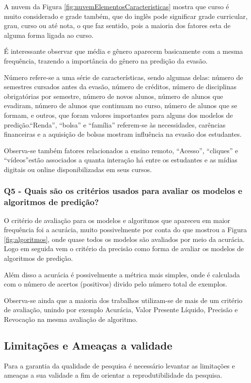 A nuvem da Figura \ref{fig:nuvemElementosCaracteristicas} mostra que curso é muito considerado e grade também, que do inglês pode significar grade curricular, grau, curso ou até nota, o que faz sentido, pois a maioria dos fatores esta de alguma forma ligada ao curso. 

É interessante observar que média e gênero aparecem basicamente com a mesma frequência, trazendo a importância do gênero na predição da evasão.

Número refere-se a uma série de características, sendo algumas delas: número de semestres cursados antes da evasão, número de créditos, número de disciplinas obrigatórias por semestre, número de novos alunos, número de alunos que evadiram, número de alunos que continuam no curso, número de alunos que se formam, e outros, que foram valores importantes para alguns dos modelos de predição.“Renda”, “bolsa” e “família” referem-se às necessidades, carências financeiras e a aquisição de bolsas mostram influência na evasão dos estudantes. 

Observa-se também fatores relacionados a ensino remoto, “Acesso”, “cliques” e “vídeos”estão associados a quanta interação há entre os estudantes e as mídias digitais ou online disponibilizadas em seus cursos. 

\subsubsection{Q5 - Quais são os critérios usados para avaliar os modelos e algoritmos de predição?}\label{sub:q5}

O critério de avaliação para os modelos e algoritmos que apareceu em maior frequência foi a acurácia, muito possivelmente por conta do que mostrou a Figura \ref{fig:algoritmos}, onde quase todos os modelos são avaliados por meio da acurácia. Logo em seguida vem o critério da precisão como forma de avaliar os modelos de algoritmos de predição. 

Além disso a acurácia é possivelmente a métrica mais simples, onde é calculada com o número de acertos (positivos) divido pelo número total de exemplos.

Observa-se ainda que a maioria dos trabalhos utilizam-se de mais de um critério de avaliação, unindo por exemplo Acurácia, Valor Presente Líquido, Precisão e Revocação na mesma avaliação de algoritmo. 

\subsection{Limitações e Ameaças a validade}\label{sub:limitacoeseameacas}
Para a garantia da qualidade de pesquisa é necessário levantar as limitações e ameaças a sua validade a fim de orientar a reprodutibilidade da pesquisa.

